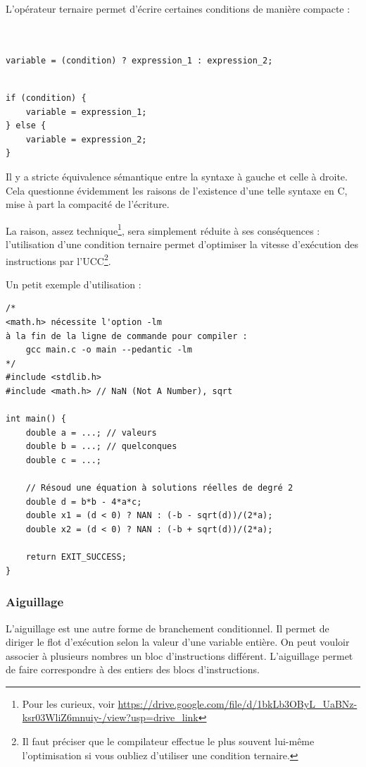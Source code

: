 \documentclass[../../../main.tex]{subfiles}
\begin{document}
L'opérateur ternaire permet d'écrire certaines conditions de manière compacte :
 
\begin{minipage}{0.65\textwidth}
\begin{verbatim}


variable = (condition) ? expression_1 : expression_2;


\end{verbatim}
\end{minipage}
\begin{minipage}{0.35\textwidth}
\begin{verbatim}
if (condition) {
	variable = expression_1;
} else {
	variable = expression_2;
}
\end{verbatim}
\end{minipage}
 
Il y a stricte équivalence sémantique entre la syntaxe à gauche et celle à droite. Cela questionne évidemment les raisons de l'existence d'une telle syntaxe en C, mise à part la compacité de l'écriture.
 
La raison, assez technique\footnote{Pour les curieux, voir \url{https://drive.google.com/file/d/1bkLb3OByL_UaBNz-ksr03WliZ6mnuiy-/view?usp=drive_link}}, sera simplement réduite à ses conséquences : l'utilisation d'une condition ternaire permet d'optimiser la vitesse d'exécution des instructions par l'UCC\footnote{Il faut préciser que le compilateur effectue le plus souvent lui-même l'optimisation si vous oubliez d'utiliser une condition ternaire.}.
 
Un petit exemple d'utilisation :
\begin{verbatim}
/*
<math.h> nécessite l'option -lm
à la fin de la ligne de commande pour compiler :
	gcc main.c -o main --pedantic -lm
*/
#include <stdlib.h>
#include <math.h> // NaN (Not A Number), sqrt

int main() {
	double a = ...; // valeurs
	double b = ...; // quelconques
	double c = ...;

	// Résoud une équation à solutions réelles de degré 2
	double d = b*b - 4*a*c;
	double x1 = (d < 0) ? NAN : (-b - sqrt(d))/(2*a);
	double x2 = (d < 0) ? NAN : (-b + sqrt(d))/(2*a);

	return EXIT_SUCCESS;
}
\end{verbatim}
\subsubsection{Aiguillage}
L'aiguillage est une autre forme de branchement conditionnel. Il permet de diriger le flot d'exécution selon la valeur d'une variable entière. On peut vouloir associer à plusieurs nombres un bloc d'instructions différent. L'aiguillage permet de faire correspondre à des entiers des blocs d'instructions.
 
\end{document}
